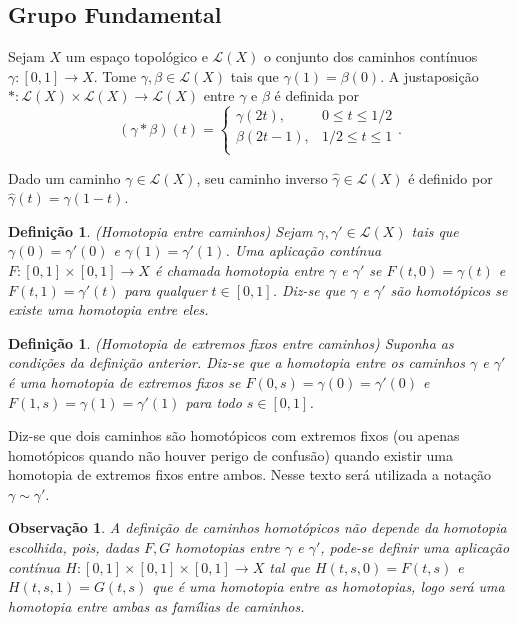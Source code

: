 \documentclass[12pt]{book}
\newtheorem{definicao}[teorema]{Definição}
\newtheorem{observacao}[teorema]{Observação}
\newcommand{\caminhos}{\mathcal{L}}
\newcommand{\caminhossempontobase}[1]{\caminhos(#1)}
\newcommand{\funcaocond}[5]{
	#1 = 
	\left\{
	\begin{array}{cc}
		#2, & #3\\
		#4, & #5\\
	\end{array}
	\right.
}
\newcommand{\intervalo}{[0,1]}
\begin{document}
	\subsection{Grupo Fundamental}
	
	Sejam $X$ um espaço topológico e $\caminhossempontobase{X}$ o conjunto dos caminhos contínuos $\gamma:[0,1]\to X$. Tome $\gamma, \beta \in \caminhossempontobase{X}$ tais que $\gamma(1) = \beta(0)$. A justaposição $*:\caminhossempontobase{X}\times \caminhossempontobase{X} \to \caminhossempontobase{X}$ entre $\gamma$ e $\beta$ é definida por
	$$
	\funcaocond{(\gamma*\beta)(t)}{\gamma(2t)}{0\leq t \leq 1/2}{\beta(2t-1)}{1/2 \leq t \leq 1}.
	$$
	
	Dado um caminho $\gamma\in \caminhossempontobase{X}$, seu caminho inverso $\hat{\gamma} \in \caminhossempontobase{X}$ é definido por $\hat{\gamma} (t) = \gamma(1-t)$.
	
	
	\begin{definicao}\label{definicao_caminhos_homotopicos}
		(Homotopia entre caminhos) Sejam $\gamma, \gamma' \in \caminhossempontobase{X}$ tais que $\gamma(0)=\gamma'(0)$ e $\gamma(1)=\gamma'(1)$. Uma aplicação contínua $F:\intervalo \times \intervalo \to X$ é chamada homotopia entre $\gamma$ e $\gamma'$ se $F(t, 0) = \gamma(t)$ e $F(t, 1) = \gamma'(t)$ para qualquer $t\in \intervalo$. Diz-se que  $\gamma$ e $\gamma'$ são homotópicos se existe uma homotopia entre eles.
	\end{definicao}
	
	\begin{definicao}\label{definicao_homotopia_extremos_fixos}
		(Homotopia de extremos fixos entre caminhos) Suponha as condições da definição anterior. Diz-se que a homotopia entre os caminhos $\gamma$ e $\gamma'$ é uma homotopia de extremos fixos se $F(0,s) = \gamma(0) = \gamma'(0)$ e $F(1,s) = \gamma(1) = \gamma'(1)$ para todo $s\in \intervalo$.
	\end{definicao}
	
	Diz-se que dois caminhos são homotópicos com extremos fixos (ou apenas homotópicos quando não houver perigo de confusão) quando existir uma homotopia de extremos fixos entre ambos. Nesse texto será utilizada a notação $\gamma \sim \gamma'$.
	
	\begin{observacao}
		A definição de caminhos homotópicos não depende da homotopia escolhida, pois, dadas $F,G$ homotopias entre $\gamma$ e $\gamma'$, pode-se definir uma aplicação contínua $H: [0,1] \times [0,1] \times [0,1] \to X$ tal que $H(t,s ,0) = F(t,s)$ e $H(t,s, 1) = G(t,s)$ que é uma homotopia entre as homotopias, logo será uma homotopia entre ambas as famílias de caminhos.
	\end{observacao}
	
\end{document}
